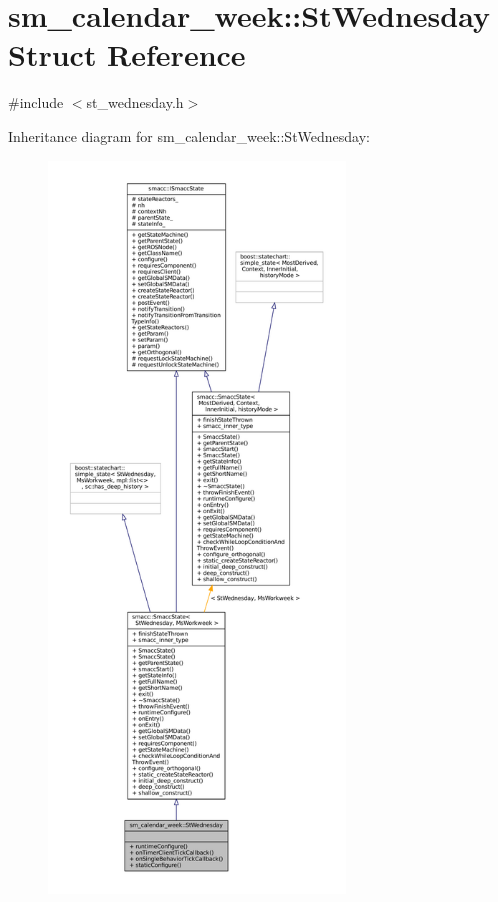 \hypertarget{structsm__calendar__week_1_1StWednesday}{}\section{sm\+\_\+calendar\+\_\+week\+:\+:St\+Wednesday Struct Reference}
\label{structsm__calendar__week_1_1StWednesday}


{\ttfamily \#include $<$st\+\_\+wednesday.\+h$>$}



Inheritance diagram for sm\+\_\+calendar\+\_\+week\+:\+:St\+Wednesday\+:
\nopagebreak
\begin{figure}[H]
\begin{center}
\leavevmode
\includegraphics[height=550pt]{structsm__calendar__week_1_1StWednesday__inherit__graph}
\end{center}
\end{figure}


